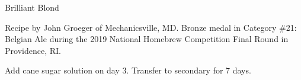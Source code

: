 \stylesection{\stylebelgianblondale}

\begin{recipe}{Brilliant Blond}

\begin{aboutblock}
Recipe by John Groeger of Mechanicsville, MD. Bronze medal in Category \#21:
Belgian Ale during the 2019 National Homebrew Competition Final Round in
Providence, RI. \sourceaha
\end{aboutblock}


\begin{methodandtiming}
 
\begin{mashsteps}
\end{mashsteps}

\begin{fermentationsteps}
\end{fermentationsteps}

\begin{directions}
Add cane sugar solution on day 3. Transfer to secondary for 7 days.
\end{directions}

\end{methodandtiming}

\recipebreak

\begin{ingredientsblock}

\begin{malts}
\end{malts}

\begin{hops}
\end{hops}


\begin{twists}
\end{twists}

\end{ingredientsblock}

\end{recipe}
